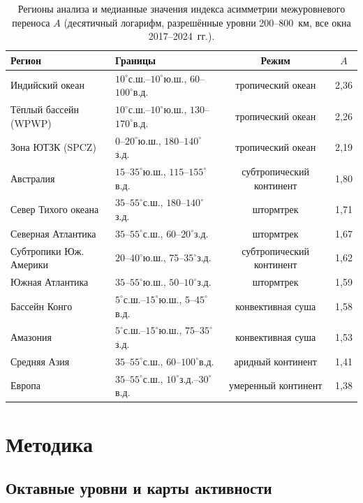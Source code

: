 \documentclass[11pt,a4paper]{article}
\begin{document}
\begin{table}[t]
\centering
\caption{Регионы анализа и медианные значения индекса асимметрии межуровневого переноса $A$ (десятичный логарифм, разрешённые уровни 200--800~км, все окна 2017--2024~гг.).}
\label{tab:regions}
\small
\begin{tabular}{@{}llcc@{}}
\toprule
Регион & Границы & Режим & $A$\\
\midrule
Индийский океан & $10^\circ$с.ш.--$10^\circ$ю.ш., $60$--$100^\circ$в.д. & тропический океан & 2{,}36\\
Тёплый бассейн (WPWP) & $10^\circ$с.ш.--$10^\circ$ю.ш., $130$--$170^\circ$в.д. & тропический океан & 2{,}26\\
Зона ЮТЗК (SPCZ) & $0$--$20^\circ$ю.ш., $180$--$140^\circ$з.д. & тропический океан & 2{,}19\\
Австралия & $15$--$35^\circ$ю.ш., $115$--$155^\circ$в.д. & субтропический континент & 1{,}80\\
Север Тихого океана & $35$--$55^\circ$с.ш., $180$--$140^\circ$з.д. & штормтрек & 1{,}71\\
Северная Атлантика & $35$--$55^\circ$с.ш., $60$--$20^\circ$з.д. & штормтрек & 1{,}67\\
Субтропики Юж. Америки & $20$--$40^\circ$ю.ш., $75$--$35^\circ$з.д. & субтропический континент & 1{,}62\\
Южная Атлантика & $35$--$55^\circ$ю.ш., $50$--$10^\circ$з.д. & штормтрек & 1{,}59\\
Бассейн Конго & $5^\circ$с.ш.--$15^\circ$ю.ш., $5$--$45^\circ$в.д. & конвективная суша & 1{,}58\\
Амазония & $5^\circ$с.ш.--$15^\circ$ю.ш., $75$--$35^\circ$з.д. & конвективная суша & 1{,}53\\
Средняя Азия & $35$--$55^\circ$с.ш., $60$--$100^\circ$в.д. & аридный континент & 1{,}41\\
Европа & $35$--$55^\circ$с.ш., $10^\circ$з.д.--$30^\circ$в.д. & умеренный континент & 1{,}38\\
\bottomrule
\end{tabular}
\end{table}

\section{Методика}
\label{sec:methods}

\subsection{Октавные уровни и карты активности}
\end{document}
